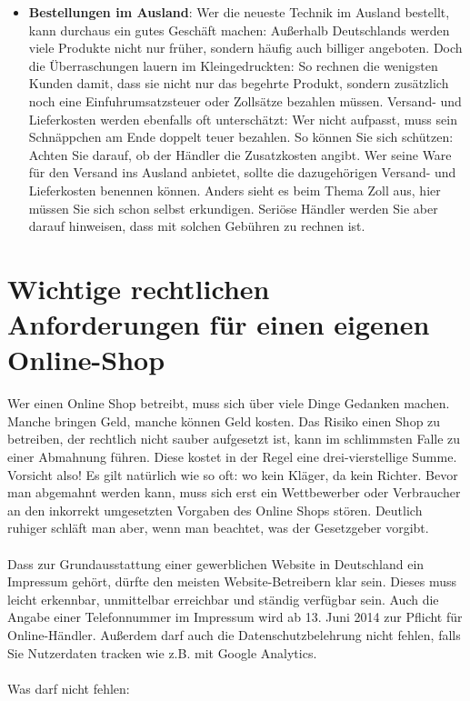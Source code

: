 \documentclass[a4paper]{article}
\begin{document}
\begin{itemize}
\item \textbf{Bestellungen im Ausland}: Wer die neueste Technik im Ausland bestellt, kann durchaus ein gutes Geschäft machen: Außerhalb Deutschlands werden viele Produkte nicht nur früher, sondern häufig auch billiger angeboten. Doch die Überraschungen lauern im Kleingedruckten: So rechnen die wenigsten Kunden damit, dass sie nicht nur das begehrte Produkt, sondern zusätzlich noch eine Einfuhrumsatzsteuer oder Zollsätze bezahlen müssen. Versand- und Lieferkosten werden ebenfalls oft unterschätzt: Wer nicht aufpasst, muss sein Schnäppchen am Ende doppelt teuer bezahlen. So können Sie sich schützen: Achten Sie darauf, ob der Händler die Zusatzkosten angibt. Wer seine Ware für den Versand ins Ausland anbietet, sollte die dazugehörigen Versand- und Lieferkosten benennen können. Anders sieht es beim Thema Zoll aus, hier müssen Sie sich schon selbst erkundigen. Seriöse Händler werden Sie aber darauf hinweisen, dass mit solchen Gebühren zu rechnen ist.

\end{itemize}

\newpage
\section{Wichtige rechtlichen Anforderungen für einen eigenen Online-Shop}

Wer einen Online Shop betreibt, muss sich über viele Dinge Gedanken machen. Manche bringen Geld, manche können Geld kosten. Das Risiko einen Shop zu betreiben, der rechtlich nicht sauber aufgesetzt ist, kann im schlimmsten Falle zu einer Abmahnung führen. Diese kostet in der Regel eine drei-vierstellige Summe. Vorsicht also! Es gilt natürlich wie so oft: wo kein Kläger, da kein Richter. Bevor man abgemahnt werden kann, muss sich erst ein Wettbewerber oder Verbraucher an den inkorrekt umgesetzten Vorgaben des Online Shops stören. Deutlich ruhiger schläft man aber, wenn man beachtet, was der Gesetzgeber vorgibt.\\\\
Dass zur Grundausstattung einer gewerblichen Website in Deutschland ein Impressum gehört, dürfte den meisten Website-Betreibern klar sein. Dieses muss leicht erkennbar, unmittelbar erreichbar und ständig verfügbar sein. Auch die Angabe einer Telefonnummer im Impressum wird ab 13. Juni 2014 zur Pflicht für Online-Händler. Außerdem darf auch die Datenschutzbelehrung nicht fehlen, falls Sie Nutzerdaten tracken wie z.B. mit Google Analytics.\\\\
Was darf nicht fehlen:
\end{document}
